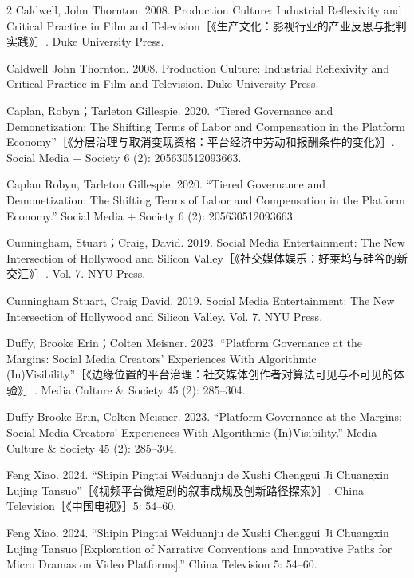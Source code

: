 \documentclass[10pt,a4paper]{article}
\begin{document}
\begin{paracol}{2}
Caldwell, John Thornton. 2008. Production Culture: Industrial Reflexivity and Critical Practice in Film and Television［《生产文化：影视行业的产业反思与批判实践》］. Duke University Press.\par
\switchcolumn
Caldwell John Thornton. 2008. Production Culture: Industrial Reflexivity and Critical Practice in Film and Television. Duke University Press.\par
\switchcolumn*
Caplan, Robyn；Tarleton Gillespie. 2020. “Tiered Governance and Demonetization: The Shifting Terms of Labor and Compensation in the Platform Economy”［《分层治理与取消变现资格：平台经济中劳动和报酬条件的变化》］. Social Media + Society 6 (2): 205630512093663.\par
\switchcolumn
Caplan Robyn, Tarleton Gillespie. 2020. “Tiered Governance and Demonetization: The Shifting Terms of Labor and Compensation in the Platform Economy.” Social Media + Society 6 (2): 205630512093663.\par
\switchcolumn*
Cunningham, Stuart；Craig, David. 2019. Social Media Entertainment: The New Intersection of Hollywood and Silicon Valley［《社交媒体娱乐：好莱坞与硅谷的新交汇》］. Vol. 7. NYU Press.\par
\switchcolumn
Cunningham Stuart, Craig David. 2019. Social Media Entertainment: The New Intersection of Hollywood and Silicon Valley. Vol. 7. NYU Press.\par
\switchcolumn*
Duffy, Brooke Erin；Colten Meisner. 2023. “Platform Governance at the Margins: Social Media Creators’ Experiences With Algorithmic (In)Visibility”［《边缘位置的平台治理：社交媒体创作者对算法可见与不可见的体验》］. Media Culture \& Society 45 (2): 285–304.\par
\switchcolumn
Duffy Brooke Erin, Colten Meisner. 2023. “Platform Governance at the Margins: Social Media Creators’ Experiences With Algorithmic (In)Visibility.” Media Culture \& Society 45 (2): 285–304.\par
\switchcolumn*
Feng Xiao. 2024. “Shipin Pingtai Weiduanju de Xushi Chenggui Ji Chuangxin Lujing Tansuo”［《视频平台微短剧的叙事成规及创新路径探索》］. China Television［《中国电视》］5: 54–60.\par
\switchcolumn
Feng Xiao. 2024. “Shipin Pingtai Weiduanju de Xushi Chenggui Ji Chuangxin Lujing Tansuo [Exploration of Narrative Conventions and Innovative Paths for Micro Dramas on Video Platforms].” China Television 5: 54–60.\par

\end{paracol}
\end{document}
